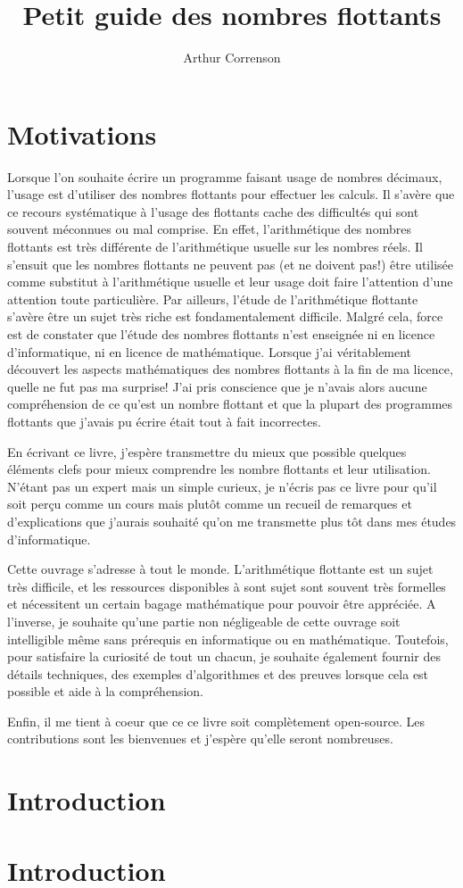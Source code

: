 \documentclass{book}
\begin{document}
  \title{Petit guide des nombres flottants}
  \author{Arthur Correnson}
  \maketitle
  \tableofcontents
  
  \chapter*{Motivations}

  Lorsque l'on souhaite écrire un programme faisant usage de nombres décimaux, l'usage est d'utiliser des nombres flottants pour effectuer les calculs. Il s'avère que ce recours systématique à l'usage des flottants cache des difficultés qui sont souvent méconnues ou mal comprise. En effet, l'arithmétique des nombres flottants est très différente de l'arithmétique usuelle sur les nombres réels. Il s'ensuit que les nombres flottants ne peuvent pas (et ne doivent pas!) être utilisée comme substitut à l'arithmétique usuelle et leur usage doit faire l'attention d'une attention toute particulière. Par ailleurs, l'étude de l'arithmétique flottante s'avère être un sujet très riche est fondamentalement difficile. Malgré cela, force est de constater que l'étude des nombres flottants n'est enseignée ni en licence d'informatique, ni en licence de mathématique. Lorsque j'ai véritablement découvert les aspects mathématiques des nombres flottants à la fin de ma licence, quelle ne fut pas ma surprise! J'ai pris conscience que je n'avais alors aucune compréhension de ce qu'est un nombre flottant et que la plupart des programmes flottants que j'avais pu écrire était tout à fait incorrectes.

  En écrivant ce livre, j'espère transmettre du mieux que possible quelques éléments clefs pour mieux comprendre les nombre flottants et leur utilisation. N'étant pas un expert mais un simple curieux, je n'écris pas ce livre pour qu'il soit perçu comme un cours mais plutôt comme un recueil de remarques et d'explications que j'aurais souhaité qu'on me transmette plus tôt dans mes études d'informatique.

  Cette ouvrage s'adresse à tout le monde. L'arithmétique flottante est un sujet très difficile, et les ressources disponibles à sont sujet sont souvent très formelles et nécessitent un certain bagage mathématique pour pouvoir être appréciée. A l'inverse, je souhaite qu'une partie non négligeable de cette ouvrage soit intelligible même sans prérequis en informatique ou en mathématique.
  Toutefois, pour satisfaire la curiosité de tout un chacun, je souhaite également fournir des détails techniques, des exemples d'algorithmes et des preuves lorsque cela est possible et aide à la compréhension.

  Enfin, il me tient à coeur que ce ce livre soit complètement open-source. Les contributions sont les bienvenues et j'espère qu'elle seront nombreuses.

  \chapter{Introduction}


  \chapter{Introduction}
\end{document}
